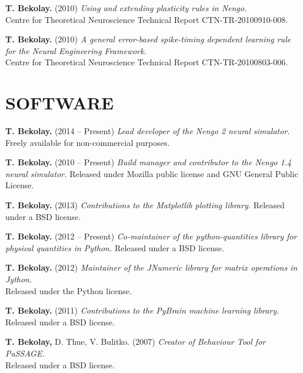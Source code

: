 \documentclass[line,margin]{res}
\begin{document}
\begin{resume}
\textbf{T. Bekolay.} (2010)
  {\sl Using and extending plasticity rules in Nengo.} \\
  Centre for Theoretical Neuroscience Technical Report CTN-TR-20100910-008.

\textbf{T. Bekolay.} (2010)
  {\sl A general error-based spike-timing dependent learning rule for
  the Neural Engineering Framework.} \\
  Centre for Theoretical Neuroscience Technical Report CTN-TR-20100803-006.



\section{SOFTWARE}

\textbf{T. Bekolay.} (2014 -- Present)
  {\sl Lead developer of the Nengo 2 neural simulator.}
  Freely available for non-commercial purposes.

\textbf{T. Bekolay.} (2010 -- Present)
  {\sl Build manager and contributor to the Nengo 1.4 neural simulator.}
  Released under Mozilla public license and GNU General Public License.

\textbf{T. Bekolay.} (2013)
  {\sl Contributions to the Matplotlib plotting library.}
  Released under a BSD license.

\textbf{T. Bekolay.} (2012 -- Present)
  {\sl Co-maintainer of the python-quantities library for physical quantities
  in Python.} Released under a BSD license.

\textbf{T. Bekolay.} (2012)
  {\sl Maintainer of the JNumeric library for matrix operations in Jython.} \\
  Released under the Python license.

\textbf{T. Bekolay.} (2011)
  {\sl Contributions to the PyBrain machine learning library.} \\
  Released under a BSD license.

\textbf{T. Bekolay,} D. Thue, V. Bulitko. (2007)
  {\sl Creator of Behaviour Tool for PaSSAGE.} \\
  Released under a BSD license.

\label{LastPage}
\end{resume}
\end{document}

